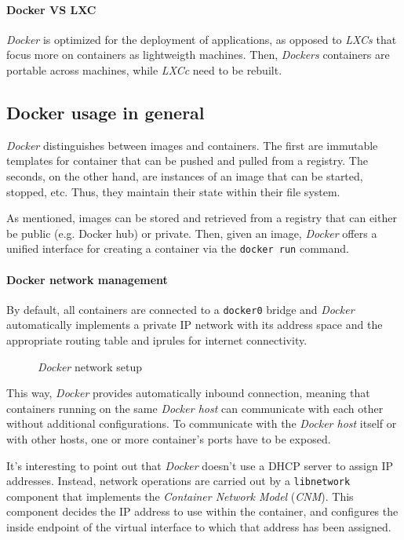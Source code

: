 \paragraph{Docker VS LXC}
\emph{Docker} is optimized for the deployment of applications, as opposed to
\emph{LXCs} that focus more on containers as lightweigth machines. Then,
\emph{Dockers} containers are portable across machines, while \emph{LXCc} need
to be rebuilt.

\subsection{Docker usage in general}
\emph{Docker} distinguishes between images and containers. The first are
immutable templates for container that can be pushed and pulled from a registry.
The seconds, on the other hand, are instances of an image that can be started,
stopped, etc. Thus, they maintain their state within their file system.

As mentioned, images can be stored and retrieved from a registry that can
either be public (e.g. Docker hub) or private. Then, given an image, \emph{Docker}
offers a unified interface for creating a container via the \texttt{docker run}
command.

\paragraph{Docker network management}
By default, all containers are connected to a \texttt{docker0} bridge and
\emph{Docker} automatically implements a private IP network with its address
space and the appropriate routing table and iprules for internet connectivity.

\begin{figure}[h!]
    \centering
    \caption{\emph{Docker} network setup}
\end{figure}

\noindent
This way, \emph{Docker} provides automatically inbound connection, meaning that
containers running on the same \emph{Docker host} can communicate with each other
without additional configurations. To communicate with the \emph{Docker host}
itself or with other hosts, one or more container's ports have to be exposed.

It's interesting to point out that \emph{Docker} doesn't use a DHCP server
to assign IP addresses. Instead, network operations are carried out by a
\texttt{libnetwork} component that implements the \emph{Container Network
Model} (\emph{CNM}). This component decides the IP address to use within the
container, and configures the inside endpoint of the virtual interface to
which that address has been assigned.

